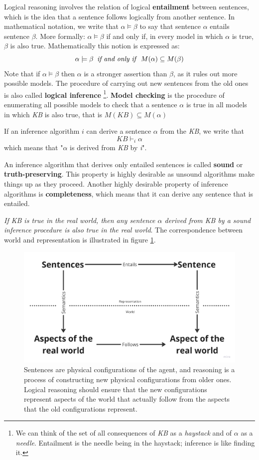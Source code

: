 \documentclass{article}
\begin{document}
Logical reasoning involves the relation of logical \textbf{entailment} between sentences, which is the idea that a sentence follows logically from another sentence. In mathematical notation, we write that \(\alpha\models\beta\) to say that sentence \(\alpha\) entails sentence \(\beta\). More formally: \(\alpha\models\beta\) if and only if, in every model in which \(\alpha\) is true, \(\beta\) is also true. Mathematically this notion is expressed as:
\[\alpha \models \beta \;\; \text{\textit{if and only if}} \;\; M(\alpha) \subseteq M(\beta)\]
Note that if \(\alpha \models \beta \) then \(\alpha\) is a stronger assertion than \(\beta\), as it rules out more possible models. The procedure of carrying out new sentences from the old ones is also called \textbf{logical inference} \footnote{We can think of the set of all consequences of \textit{KB} as a \textit{haystack} and of \(\alpha\) as a \textit{needle}. Entailment is the needle being in the haystack; inference is like finding it.}. \textbf{Model checking} is the procedure of enumerating all possible models to check that a sentence \(\alpha\) is true in all models in which \textit{KB} is also true, that is \(M(KB)\subseteq M(\alpha)\)


If an inference algorithm \(i\) can derive a sentence \(\alpha\) from the \textit{KB}, we write that
    \[KB \vdash_i\alpha\]
which means that "\(\alpha\) is derived from \textit{KB} by \textit{i}".

An inference algorithm that derives only entailed sentences is called \textbf{sound} or \textbf{truth-preserving}. This property is highly desirable as unsound algorithms make things up as they proceed. 
Another highly desirable property of inference algorithms is \textbf{completeness}, which means that it can derive any sentence that is entailed.

\textit{If KB is true in the real world, then any sentence \(\alpha\) derived from KB by a sound inference procedure is also true in the real world}. The correspondence between world and representation is illustrated in figure \ref{fig:Representation vs. Real world}.

\begin{figure}
    \centering
    \includegraphics[width=0.75\linewidth]{Representation and Real World.png}
    \caption{Sentences are physical configurations of the agent, and reasoning is a process of constructing new physical configurations from older ones. Logical reasoning should ensure that the new configurations represent aspects of the world that actually follow from the aspects that the old configurations represent.}
    \label{fig:Representation vs. Real world}
\end{figure}
\end{document}
